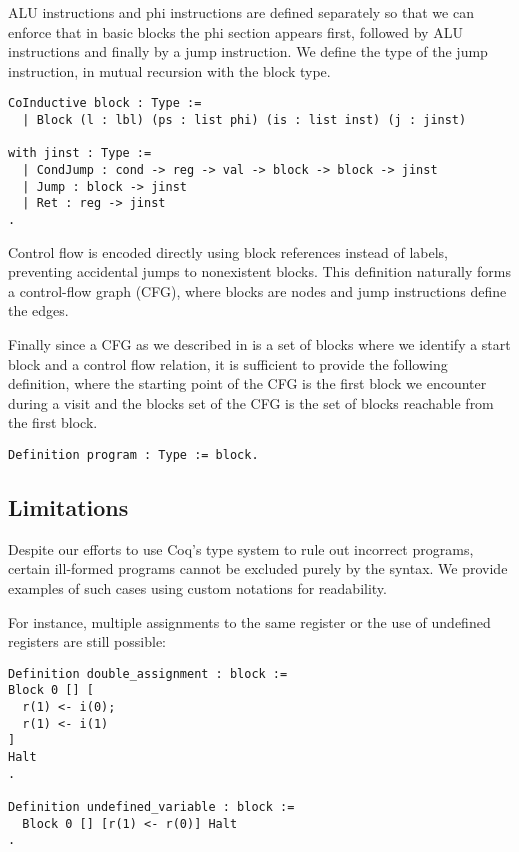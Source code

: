 ALU instructions and phi instructions are defined separately so that we can enforce that in basic blocks the phi section appears first, followed by ALU instructions and finally by a jump instruction.
We define the type of the jump instruction, in mutual recursion with the block type.

\begin{lstlisting}[language=Coq]
CoInductive block : Type :=
  | Block (l : lbl) (ps : list phi) (is : list inst) (j : jinst)

with jinst : Type :=
  | CondJump : cond -> reg -> val -> block -> block -> jinst
  | Jump : block -> jinst
  | Ret : reg -> jinst
.
\end{lstlisting}

Control flow is encoded directly using block references instead of labels, preventing accidental jumps to nonexistent blocks. This definition naturally forms a control-flow graph (CFG), where blocks are nodes and jump instructions define the edges.

Finally since a CFG as we described in  is a set of blocks where we identify a start block and a control flow relation, it is sufficient to provide the following definition, where the starting point of the CFG is the first block we encounter during a visit and the blocks set of the CFG is the set of blocks reachable from the first block.

\begin{lstlisting}[language=Coq]
Definition program : Type := block.
\end{lstlisting}


\subsection{Limitations}

Despite our efforts to use Coq's type system to rule out incorrect programs, certain ill-formed programs cannot be excluded purely by the syntax. We provide examples of such cases using custom notations for readability.

For instance, multiple assignments to the same register or the use of undefined registers are still possible:

\begin{lstlisting}[language=Coq]
Definition double_assignment : block :=
Block 0 [] [
  r(1) <- i(0);
  r(1) <- i(1)
]
Halt
.

Definition undefined_variable : block :=
  Block 0 [] [r(1) <- r(0)] Halt
.
\end{lstlisting}

